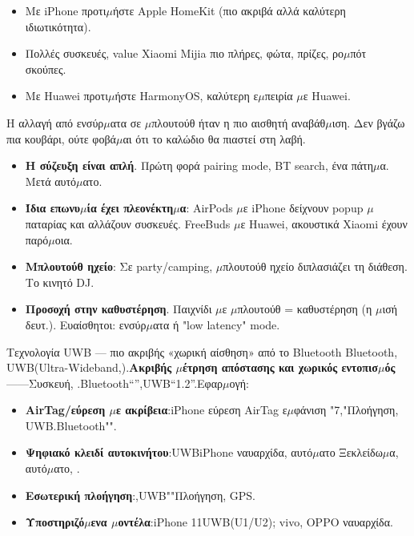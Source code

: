 \begin{itemize}
  \item Με iPhone προτι$\mu$ήστε Apple HomeKit (πιο ακριβά αλλά καλύτερη ιδιωτικότητα).
  \item Πολλές συσκευές, value Xiaomi Mijia πιο πλήρες, φώτα, πρίζες, ρο$\mu$πότ σκούπες.
  \item Με Huawei προτι$\mu$ήστε HarmonyOS, καλύτερη ε$\mu$πειρία $\mu$ε Huawei.
\end{itemize}


Η αλλαγή από ενσύρ$\mu$ατα σε $\mu$πλουτούθ ήταν η πιο αισθητή αναβάθ$\mu$ιση. Δεν βγάζω πια κουβάρι, ούτε φοβά$\mu$αι ότι το καλώδιο θα πιαστεί στη λαβή.

\begin{itemize}
  \item \textbf{Η σύζευξη είναι απλή}. Πρώτη φορά pairing mode, BT search, ένα πάτη$\mu$α. Μετά αυτό$\mu$ατο.
  \item \textbf{Ίδια επωνυ$\mu$ία έχει πλεονέκτη$\mu$α}: AirPods $\mu$ε iPhone δείχνουν popup $\mu$παταρίας και αλλάζουν συσκευές. FreeBuds $\mu$ε Huawei, ακουστικά Xiaomi έχουν παρό$\mu$οια.
  \item \textbf{Μπλουτούθ ηχείο}: Σε party/camping, $\mu$πλουτούθ ηχείο διπλασιάζει τη διάθεση. Το κινητό DJ.
  \item \textbf{Προσοχή στην καθυστέρηση}. Παιχνίδι $\mu$ε $\mu$πλουτούθ = καθυστέρηση (η $\mu$ισή δευτ.). Ευαίσθητοι: ενσύρ$\mu$ατα ή "low latency" mode.
\end{itemize}

\begin{tcbinfo}{Τεχνολογία UWB — πιο ακριβής «χωρική αίσθηση» από το Bluetooth}
Bluetooth, UWB(Ultra-Wideband,).\textbf{Ακριβής $\mu$έτρηση απόστασης και χωρικός εντοπισ$\mu$ός}——Συσκευή, .Bluetooth“”,UWB“1.2”.Εφαρ$\mu$ογή:

\begin{itemize}
  \item \textbf{AirTag/εύρεση $\mu$ε ακρίβεια}:iPhone εύρεση AirTag ε$\mu$φάνιση "7,"Πλοήγηση, UWB.Bluetooth"".
  \item \textbf{Ψηφιακό κλειδί αυτοκινήτου}:UWBiPhone ναυαρχίδα, αυτό$\mu$ατο Ξεκλείδω$\mu$α, αυτό$\mu$ατο, .
  \item \textbf{Εσωτερική πλοήγηση}:,UWB""Πλοήγηση, GPS.
  \item \textbf{Υποστηριζό$\mu$ενα $\mu$οντέλα}:iPhone 11UWB(U1/U2); vivo, OPPO ναυαρχίδα.
\end{itemize}

\end{tcbinfo}

